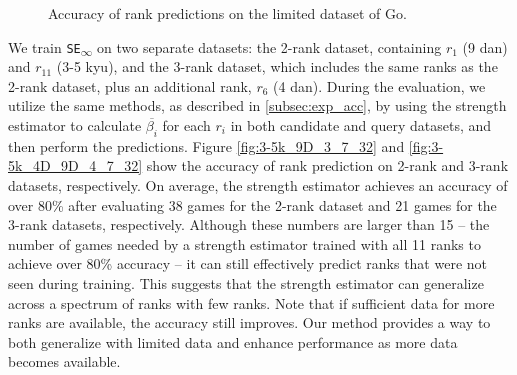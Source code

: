 \begin{figure}[h]
    \centering
    \caption{Accuracy of rank predictions on the limited dataset of Go.}
    \label{fig:future_analysis}
\end{figure}

We train \texttt{SE\textsubscript{$\infty$}} on two separate datasets: the 2-rank dataset, containing $r_1$ (9 dan) and $r_{11}$ (3-5 kyu), and the 3-rank dataset, which includes the same ranks as the 2-rank dataset, plus an additional rank, $r_6$ (4 dan).
During the evaluation, we utilize the same methods, as described in \ref{subsec:exp_acc}, by using the strength estimator to calculate $\overline{\beta_i}$ for each $r_i$ in both candidate and query datasets, and then perform the predictions.
Figure \ref{fig:3-5k_9D_3_7_32} and \ref{fig:3-5k_4D_9D_4_7_32} show the accuracy of rank prediction on 2-rank and 3-rank datasets, respectively.
On average, the strength estimator achieves an accuracy of over 80\% after evaluating 38 games for the 2-rank dataset and 21 games for the 3-rank datasets, respectively.
Although these numbers are larger than 15 -- the number of games needed by a strength estimator trained with all 11 ranks to achieve over 80\% accuracy -- it can still effectively predict ranks that were not seen during training.
This suggests that the strength estimator can generalize across a spectrum of ranks with few ranks.
Note that if sufficient data for more ranks are available, the accuracy still improves.
Our method provides a way to both generalize with limited data and enhance performance as more data becomes available.




